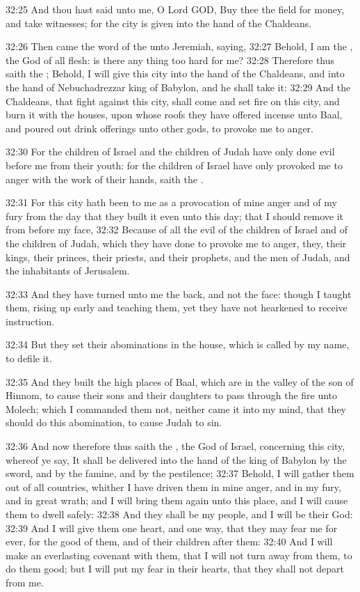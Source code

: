 32:25 And thou hast said unto me, O Lord GOD, Buy thee the field for money, and take witnesses; for the city is given into the hand of the Chaldeans.

32:26 Then came the word of the \LORD unto Jeremiah, saying, 32:27 Behold, I am the \LORD, the God of all flesh: is there any thing too hard for me?  32:28 Therefore thus saith the \LORD; Behold, I will give this city into the hand of the Chaldeans, and into the hand of Nebuchadrezzar king of Babylon, and he shall take it: 32:29 And the Chaldeans, that fight against this city, shall come and set fire on this city, and burn it with the houses, upon whose roofs they have offered incense unto Baal, and poured out drink offerings unto other gods, to provoke me to anger.

32:30 For the children of Israel and the children of Judah have only done evil before me from their youth: for the children of Israel have only provoked me to anger with the work of their hands, saith the \LORD.

32:31 For this city hath been to me as a provocation of mine anger and of my fury from the day that they built it even unto this day; that I should remove it from before my face, 32:32 Because of all the evil of the children of Israel and of the children of Judah, which they have done to provoke me to anger, they, their kings, their princes, their priests, and their prophets, and the men of Judah, and the inhabitants of Jerusalem.

32:33 And they have turned unto me the back, and not the face: though I taught them, rising up early and teaching them, yet they have not hearkened to receive instruction.

32:34 But they set their abominations in the house, which is called by my name, to defile it.

32:35 And they built the high places of Baal, which are in the valley of the son of Hinnom, to cause their sons and their daughters to pass through the fire unto Molech; which I commanded them not, neither came it into my mind, that they should do this abomination, to cause Judah to sin.

32:36 And now therefore thus saith the \LORD, the God of Israel, concerning this city, whereof ye say, It shall be delivered into the hand of the king of Babylon by the sword, and by the famine, and by the pestilence; 32:37 Behold, I will gather them out of all countries, whither I have driven them in mine anger, and in my fury, and in great wrath; and I will bring them again unto this place, and I will cause them to dwell safely: 32:38 And they shall be my people, and I will be their God: 32:39 And I will give them one heart, and one way, that they may fear me for ever, for the good of them, and of their children after them: 32:40 And I will make an everlasting covenant with them, that I will not turn away from them, to do them good; but I will put my fear in their hearts, that they shall not depart from me.


